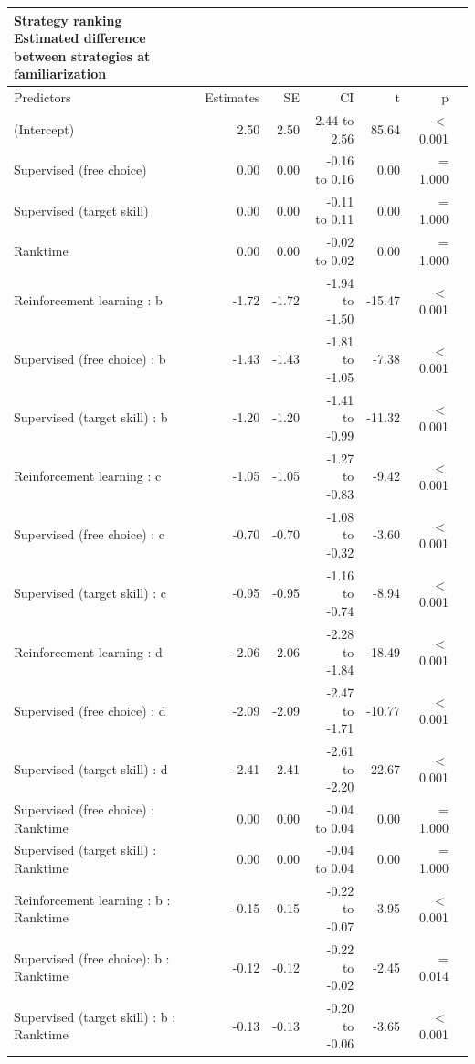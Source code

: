 \documentclass{article}
\begin{document}
\setlength{\LTpost}{0mm}
\begin{longtable}{lrrrrrl}\label{suptable_strategyranking_strategydifffam}
\caption*{
{\large Strategy ranking} \\ 
{\small Estimated difference between strategies at familiarization}
} \\ 
\toprule
Predictors & Estimates & SE & CI & t & p \\ 
\midrule\addlinespace[2.5pt]
(Intercept) & 2.50 & 2.50 & 2.44 to 2.56 & 85.64 &  $<$  0.001 \\ 
Supervised (free choice) & 0.00 & 0.00 & -0.16 to 0.16 & 0.00 &  =  1.000 \\ 
Supervised (target skill) & 0.00 & 0.00 & -0.11 to 0.11 & 0.00 &  =  1.000 \\ 
Ranktime & 0.00 & 0.00 & -0.02 to 0.02 & 0.00 &  =  1.000 \\ 
Reinforcement learning : b & -1.72 & -1.72 & -1.94 to -1.50 & -15.47 &  $<$  0.001 \\ 
Supervised (free choice) : b & -1.43 & -1.43 & -1.81 to -1.05 & -7.38 &  $<$  0.001 \\ 
Supervised (target skill) : b & -1.20 & -1.20 & -1.41 to -0.99 & -11.32 &  $<$  0.001 \\ 
Reinforcement learning : c & -1.05 & -1.05 & -1.27 to -0.83 & -9.42 &  $<$  0.001 \\ 
Supervised (free choice) : c & -0.70 & -0.70 & -1.08 to -0.32 & -3.60 &  $<$  0.001 \\ 
Supervised (target skill) : c & -0.95 & -0.95 & -1.16 to -0.74 & -8.94 &  $<$  0.001 \\ 
Reinforcement learning : d & -2.06 & -2.06 & -2.28 to -1.84 & -18.49 &  $<$  0.001 \\ 
Supervised (free choice) : d & -2.09 & -2.09 & -2.47 to -1.71 & -10.77 &  $<$  0.001 \\ 
Supervised (target skill) : d & -2.41 & -2.41 & -2.61 to -2.20 & -22.67 &  $<$  0.001 \\ 
Supervised (free choice) : Ranktime & 0.00 & 0.00 & -0.04 to 0.04 & 0.00 &  =  1.000 \\ 
Supervised (target skill) : Ranktime & 0.00 & 0.00 & -0.04 to 0.04 & 0.00 &  =  1.000 \\ 
Reinforcement learning : b : Ranktime & -0.15 & -0.15 & -0.22 to -0.07 & -3.95 &  $<$  0.001 \\ 
Supervised (free choice): b : Ranktime & -0.12 & -0.12 & -0.22 to -0.02 & -2.45 &  =  0.014 \\ 
Supervised (target skill) : b : Ranktime & -0.13 & -0.13 & -0.20 to -0.06 & -3.65 &  $<$  0.001 \\ 

\end{longtable}
\end{document}
